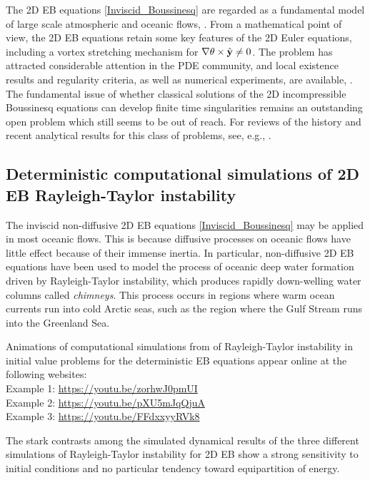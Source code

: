 \documentclass[11pt, oneside]{article}   	%
\numberwithin{equation}{section}
\theoremstyle{plain}
\theoremstyle{definition}
\theoremstyle{remark}
\newcommand{\<}{\langle}
\renewcommand{\>}{\rangle}
\def\y{{\bf{y}}}
\begin{document}
The 2D EB equations \eqref{Inviscid_Boussinesq} are regarded as a fundamental model of large scale atmospheric and oceanic flows, \cite{Ped87,Ric07}.  
From a mathematical point of view, the 2D EB equations retain some key features of the 2D Euler equations, including a vortex stretching mechanism for $\nabla\theta\times\hat{\y}\ne0$. The problem has attracted considerable attention in the PDE community, and local existence results and regularity criteria, as well as numerical experiments, are available, \cite{CanBen,HouLi1,Chae,ElgJeo}. The fundamental issue of whether classical solutions of the 2D incompressible Boussinesq equations can develop finite time singularities remains an outstanding open problem which still seems to be out of reach. For reviews of the history and recent analytical results for this class of problems, see, e.g., \cite{wang5645122inviscid}.

\subsection*{Deterministic computational simulations of 2D EB Rayleigh-Taylor instability} The inviscid non-diffusive 2D EB equations \eqref{Inviscid_Boussinesq} may be applied in most oceanic flows. This is because diffusive processes on oceanic flows have little effect because of their immense inertia. In particular, non-diffusive 2D EB equations have been used to model the process of oceanic deep water formation driven by Rayleigh-Taylor instability, which produces rapidly down-welling water columns called \emph{chimneys}. This process occurs in regions where warm ocean currents run into cold Arctic seas,  such as the region where the Gulf Stream runs into the Greenland Sea. 
\smallskip

Animations of computational simulations from \cite{HolmPan2022} of Rayleigh-Taylor instability in initial value problems for the deterministic EB equations appear online at the following websites:\\
Example 1: \url{https://youtu.be/zorhwJ0pmUI}\\
Example 2: \url{https://youtu.be/pXU5mJqQjuA}\\
Example 3: \url{https://youtu.be/FFdxxyyRVk8}

The stark contrasts among the simulated dynamical results of the three different simulations of Rayleigh-Taylor instability for 2D EB show a strong sensitivity to initial conditions and no particular tendency toward equipartition of energy. 
\end{document}
